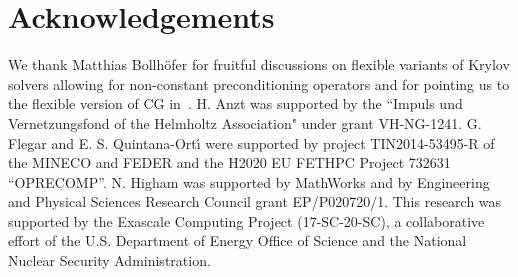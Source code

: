 \section*{Acknowledgements}

We thank Matthias Bollh\"ofer for fruitful discussions on flexible variants of Krylov 
solvers allowing for non-constant preconditioning operators and for pointing us to the flexible version of CG in~\cite{notay}.
H. Anzt was supported by the ``Impuls und Vernetzungsfond of the Helmholtz Association" under grant VH-NG-1241.
G. Flegar and E. S. Quintana-Ort\'{\i} were supported
by project TIN2014-53495-R of the MINECO and FEDER
and the H2020 EU FETHPC Project 732631 ``OPRECOMP''.
N. Higham 
was supported by MathWorks and by Engineering and Physical Sciences
Research Council grant EP/P020720/1.
This research was supported by the Exascale Computing Project (17-SC-20-SC), a 
collaborative effort of the U.S. Department of Energy Office of Science and the 
National Nuclear Security Administration.
